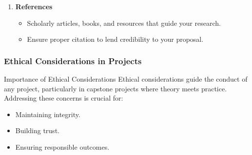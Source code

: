 \documentclass[aspectratio=169]{beamer}
\begin{document}
\begin{frame}[fragile]
\begin{enumerate}[resume]
        \item \textbf{References}
            \begin{itemize}
                \item Scholarly articles, books, and resources that guide your research.
                \item Ensure proper citation to lend credibility to your proposal.
            \end{itemize}
    \end{enumerate}
\end{frame}

\begin{frame}[fragile]
    \frametitle{Ethical Considerations in Projects}
    \begin{block}{Importance of Ethical Considerations}
        Ethical considerations guide the conduct of any project, particularly in capstone projects where theory meets practice. Addressing these concerns is crucial for:
        \begin{itemize}
            \item Maintaining integrity.
            \item Building trust.
            \item Ensuring responsible outcomes.
        \end{itemize}
    \end{block}
\end{frame}
\end{document}
